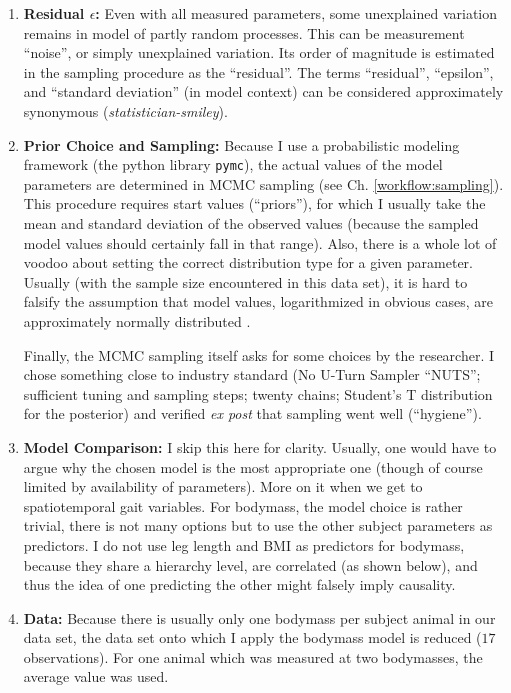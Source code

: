\begin{enumerate}
\item \textbf{Residual \(\epsilon\):}
\label{sec:orgbf53734}
Even with all measured parameters, some unexplained variation remains in model of partly random processes.
This can be measurement ``noise'', or simply unexplained variation.
Its order of magnitude is estimated in the sampling procedure as the ``residual''.
The terms ``residual'', ``epsilon'', and ``standard deviation'' (in model context) can be considered approximately synonymous (\emph{statistician-smiley}).

\item \textbf{Prior Choice and Sampling:}
\label{sec:orgf31f4ce}
Because I use a probabilistic modeling framework (the python library \texttt{pymc}), the actual values of the model parameters are determined in MCMC sampling (see Ch. \ref{workflow:sampling}).
This procedure requires start values (``priors''), for which I usually take the mean and standard deviation of the observed values (because the sampled model values should certainly fall in that range).
Also, there is a whole lot of voodoo about setting the correct distribution type for a given parameter.
Usually (with the sample size encountered in this data set), it is hard to falsify the assumption that model values, logarithmized in obvious cases, are approximately normally distributed \citep{Downey2013}.

Finally, the MCMC sampling itself asks for some choices by the researcher.
I chose something close to industry standard (No U-Turn Sampler ``NUTS''; sufficient tuning and sampling steps; twenty chains; Student's T distribution for the posterior) and verified \emph{ex post} that sampling went well (``hygiene'').

\item \textbf{Model Comparison:}
\label{sec:orgd46c837}
I skip this here for clarity.
Usually, one would have to argue why the chosen model is the most appropriate one (though of course limited by availability of parameters).
More on it when we get to spatiotemporal gait variables.
For bodymass, the model choice is rather trivial, there is not many options but to use the other subject parameters as predictors.
I do not use leg length and BMI as predictors for bodymass, because they share a hierarchy level, are correlated (as shown below), and thus the idea of one predicting the other might falsely imply causality.

\item \textbf{Data:}
\label{sec:org71ae22a}
Because there is usually only one bodymass per subject animal in our data set, the data set onto which I apply the bodymass model is reduced (\(17\) observations).
For one animal which was measured at two bodymasses, the average value was used.


\end{enumerate}
